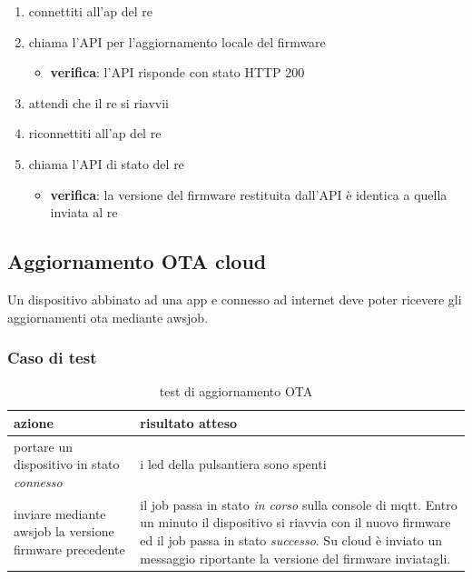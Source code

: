 \documentclass[12pt,a4paper,twoside,titlepage]{book}
\begin{document}
\begin{enumerate}
    \item connettiti all'\acrshort{ap} del \acrshort{re}
    \item chiama l'API per l'aggiornamento locale del \gls{firmware}
    \begin{itemize}
        \item \textbf{verifica}: l'API risponde con stato HTTP 200 
    \end{itemize}
    \item attendi che il \acrshort{re} si riavvii
    \item riconnettiti all'\acrshort{ap} del \acrshort{re}
    \item chiama l'API di stato del \acrshort{re}
    \begin{itemize}
        \item \textbf{verifica}: la versione del \gls{firmware} restituita dall'API è identica 
            a quella inviata al \acrshort{re}
    \end{itemize}
\end{enumerate}

\subsection{Aggiornamento OTA cloud}
\label{section:test_ota}

Un dispositivo abbinato ad una app e connesso ad internet deve poter ricevere gli
aggiornamenti \acrshort{ota} mediante \Gls{awsjob}.

\subsubsection{Caso di test}
\begin{table}
    \centering
    \begin{tabular}{| p{} | p{} |}
        \hline \textbf{azione} & \textbf{risultato atteso} \\
        \hline portare un dispositivo in stato \textit{connesso} & i \acrshort{led} della pulsantiera sono spenti \\
        \hline inviare mediante \Gls{awsjob} la versione \gls{firmware} precedente & il job passa in stato \textit{in corso} sulla console di \Gls{mqtt}. Entro un minuto il dispositivo si riavvia con il nuovo \gls{firmware} ed il job passa in stato \textit{successo}. Su cloud è inviato un messaggio riportante la versione del \gls{firmware} inviatagli. \\
        \hline
    \end{tabular}
    \caption{test di aggiornamento OTA}
\end{table}
\end{document}
